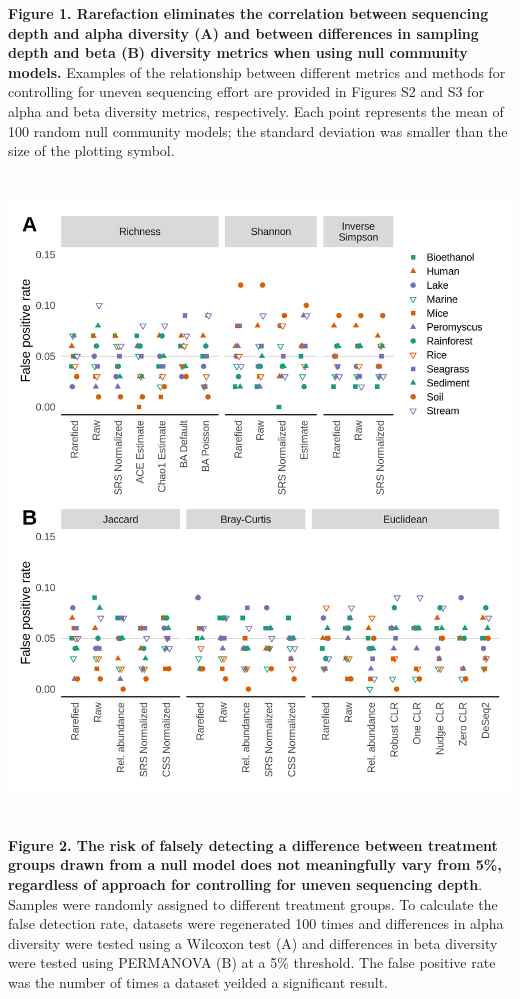 \documentclass[
]{article}
\begin{document}
\textbf{Figure 1. Rarefaction eliminates the correlation between
sequencing depth and alpha diversity (A) and between differences in
sampling depth and beta (B) diversity metrics when using null community
models.} Examples of the relationship between different metrics and
methods for controlling for uneven sequencing effort are provided in
Figures S2 and S3 for alpha and beta diversity metrics, respectively.
Each point represents the mean of 100 random null community models; the
standard deviation was smaller than the size of the plotting symbol.

\newpage

\includegraphics[height=17cm]{figure_2.png}

\textbf{Figure 2. The risk of falsely detecting a difference between
treatment groups drawn from a null model does not meaningfully vary from
5\%, regardless of approach for controlling for uneven sequencing
depth}. Samples were randomly assigned to different treatment groups. To
calculate the false detection rate, datasets were regenerated 100 times
and differences in alpha diversity were tested using a Wilcoxon test (A)
and differences in beta diversity were tested using PERMANOVA (B) at a
5\% threshold. The false positive rate was the number of times a dataset
yeilded a significant result.
\end{document}
